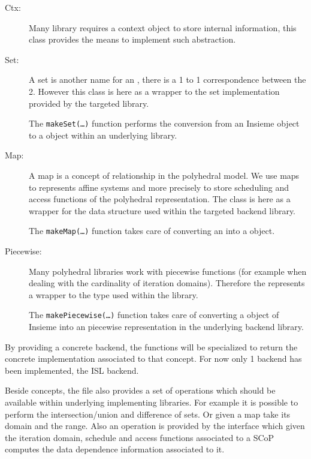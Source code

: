 \begin{description}
\item[Ctx:] Many library requires a context object to store internal
	information, this class provides the means to implement such abstraction. 

\item[Set:] A set is another name for an , there is a 1 to
	1 correspondence between the 2. However this class is here as a wrapper to
	the set implementation provided by the targeted library. 

	The {\tt makeSet(\ldots)} function performs the conversion from an Insieme
	 object to a  object within an underlying
	library. 

\item[Map:] A map is a concept of relationship in the polyhedral model. We use
	maps to represents affine systems and more precisely to store scheduling and
	access functions of the polyhedral representation. The class  is
	here as a wrapper for the data structure used within the targeted backend
	library. 

	The {\tt makeMap(\ldots)} function takes care of converting an
	 into a  object. 

\item[Piecewise:] Many polyhedral libraries work with piecewise functions (for
	example when dealing with the cardinality of iteration domains). Therefore
	the  represents a wrapper to the type used within the
	library. 

	The {\tt makePiecewise(\ldots)} function takes care of converting a
	 object of Insieme into an piecewise representation in the
	underlying backend library. 

\end{description}

By providing a concrete backend, the functions will be specialized to return the
concrete implementation associated to that concept. For now only 1 backend has
been implemented, the ISL backend. 

Beside concepts, the  file also provides a set of operations
which should be available within underlying implementing libraries. For example
it is possible to perform the intersection/union and difference of sets. Or
given a map take its domain and the range. Also an operation is provided by the
interface  which given the iteration domain, schedule
and access functions associated to a SCoP computes the data dependence
information associated to it. 

